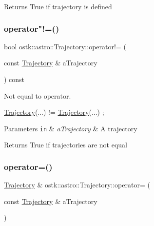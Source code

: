 \begin{DoxyReturn}{Returns}
True if trajectory is defined 
\end{DoxyReturn}
\mbox{\label{classostk_1_1astro_1_1_trajectory_abb524dcee260456d546f5e01ee9c228c}} 
\subsubsection{\texorpdfstring{operator"!=()}{operator!=()}}
{\footnotesize\ttfamily bool ostk\+::astro\+::\+Trajectory\+::operator!= (\begin{DoxyParamCaption}\item[{const \hyperlink{classostk_1_1astro_1_1_trajectory}{Trajectory} \&}]{a\+Trajectory }\end{DoxyParamCaption}) const}



Not equal to operator. 


\begin{DoxyCode}
\hyperlink{classostk_1_1astro_1_1_trajectory_a9333200bd6afed5aef4f5aad8a2a8e84}{Trajectory}(...) != \hyperlink{classostk_1_1astro_1_1_trajectory_a9333200bd6afed5aef4f5aad8a2a8e84}{Trajectory}(...) ;
\end{DoxyCode}



\begin{DoxyParams}[1]{Parameters}
\mbox{\tt in}  & {\em a\+Trajectory} & A trajectory \\
\hline
\end{DoxyParams}
\begin{DoxyReturn}{Returns}
True if trajectories are not equal 
\end{DoxyReturn}
\mbox{\label{classostk_1_1astro_1_1_trajectory_aa8229045bd7cf0696b8cd235cc3837a8}} 
\subsubsection{\texorpdfstring{operator=()}{operator=()}}
{\footnotesize\ttfamily \hyperlink{classostk_1_1astro_1_1_trajectory}{Trajectory} \& ostk\+::astro\+::\+Trajectory\+::operator= (\begin{DoxyParamCaption}\item[{const \hyperlink{classostk_1_1astro_1_1_trajectory}{Trajectory} \&}]{a\+Trajectory }\end{DoxyParamCaption})}



